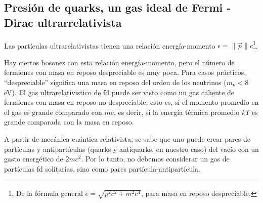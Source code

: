 





\subsection{Presión de quarks, un gas ideal de Fermi - Dirac ultrarrelativista}\label{sec-Pquarks}

Las partículas ultrarelativistas tienen una relación energía-momento $\epsilon = \| \overrightarrow{p} \| c$\footnote{De la fórmula general $\epsilon = \sqrt{{p}^{2}{c}^{2} + {m}^{2}{c}^{4}}$, para masa en reposo despreciable.}.

Hay ciertos bosones con esta relación energía-momento, pero el número de fermiones con masa en reposo despreciable es muy poca. Para casos prácticos, ``despreciable'' significa una masa en reposo del orden de los neutrinos (${m}_{\nu} < 8 $eV). El gas ultrarelativistico de \acrshort{fd} puede ser visto como un gas caliente de fermiones con masa en reposo no despreciable, esto es, si el momento promedio en el gas es grande comparado con $mc$, es decir, si la energía térmica promedio $kT$ es grande comparada con la masa en reposo.

A partir de mecánica cuántica relativista, se sabe que uno puede crear pares de partículas y antipartículas (quarks y antiquarks, en nuestro caso) del vacío con un gasto energético de $2m{c}^{2}$. Por lo tanto, no debemos considerar un gas de partículas \acrshort{fd} solitarias, sino como pares partícula-antipartícula.

